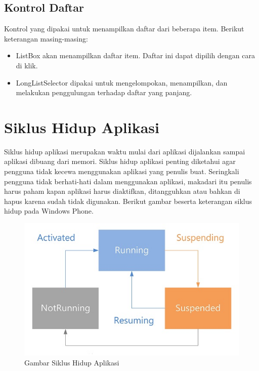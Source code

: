 \subsection{Kontrol Daftar}
\label{subsec:Kontrol Daftar}
\hspace{0.5cm} Kontrol yang dipakai untuk menampilkan daftar dari beberapa item. Berikut keterangan masing-masing:

\begin{itemize}
	\item ListBox akan menampilkan daftar item. Daftar ini dapat dipilih dengan cara di klik.
	\item LongListSelector dipakai untuk mengelompokan, menampilkan, dan melakukan penggulungan terhadap daftar yang panjang.
\end{itemize}

\section{Siklus Hidup Aplikasi}
\label{sec:Siklus Hidup Aplikasi}
\hspace{0.5cm} Siklus hidup aplikasi merupakan waktu mulai dari aplikasi dijalankan sampai aplikasi dibuang dari memori. Siklus hidup aplikasi penting diketahui agar pengguna tidak kecewa menggunakan aplikasi yang penulis buat. Seringkali pengguna tidak berhati-hati dalam menggunakan aplikasi, makadari itu penulis harus paham kapan aplikasi harus diaktifkan, ditangguhkan atau bahkan di hapus karena sudah tidak digunakan. Berikut gambar beserta keterangan siklus hidup pada Windows Phone.

\begin{figure}[h]
	\centering
		\includegraphics[scale=0.7]{Gambar/lifecycle}
	\caption{Gambar Siklus Hidup Aplikasi}
	\label{fig:Siklus Hidup Aplikasi}
\end{figure}

